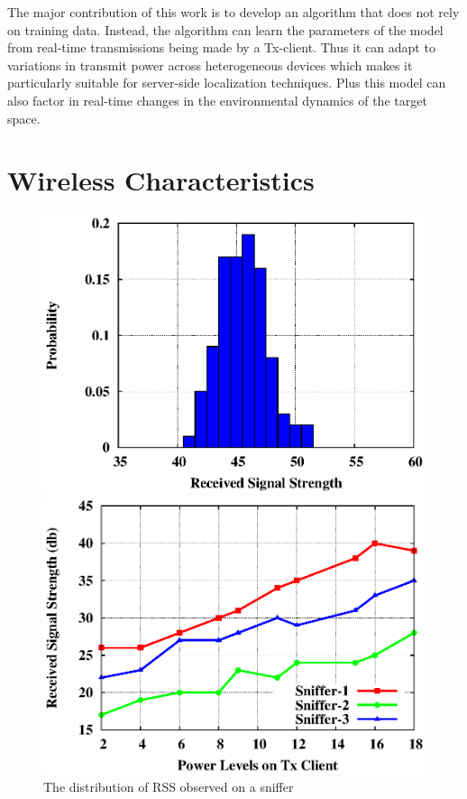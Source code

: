\documentclass{Localization-PaperWriteupDraft}
\begin{document}
The major contribution of this work is to develop an algorithm that does
not rely on training data. Instead, the algorithm can learn the
parameters of the model from real-time transmissions being made by a
Tx-client. Thus it can adapt to variations in transmit power across
heterogeneous devices which makes it particularly suitable for
server-side localization techniques. Plus this model can also factor in
real-time changes in the environmental dynamics of the target space. 

\section{Wireless Characteristics}
\label{sec:wirelesscharacteristics}

\begin{figure}
\begin{minipage}{0.3\textwidth}
\includegraphics[width=1\textwidth]{Figs4Paper/GaussianDistr/gaussian.eps}
\caption{The distribution of RSS observed on a sniffer}
\label{fig:distribution}
\end{minipage}\quad %
\begin{minipage}{0.3\textwidth}%
\includegraphics[width=1\textwidth]{Figs4Paper/TxPower/Tx_PowerLevels.eps}

\end{minipage}
\end{figure}
\end{document}
